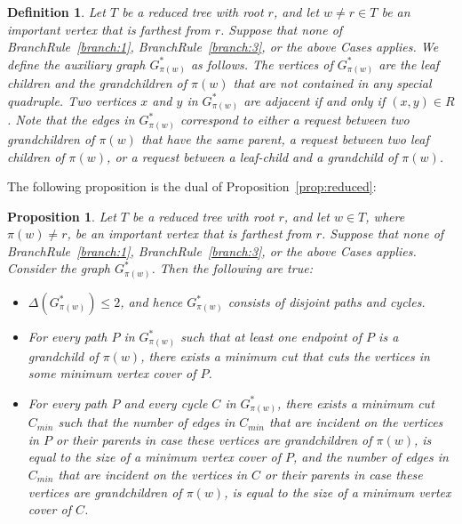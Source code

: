 \documentclass[11pt]{article}
\newtheorem{proposition}[theorem]{Proposition}
\newtheorem{definition}{Definition}[section]
\begin{document}
\begin{definition}\rm
\label{def:auxiliary1}
Let $T$ be a reduced tree with root $r$, and let $w \neq r \in T$ be an important vertex that is farthest from $r$. Suppose that none of BranchRule~\ref{branch:1}, BranchRule~\ref{branch:3}, or the above Cases applies. We define the auxiliary graph $G^*_{\pi(w)}$ as follows. The vertices of $G^*_{\pi(w)}$
are the leaf children and the grandchildren of $\pi(w)$ that are not contained in any special quadruple.  Two vertices $x$ and $y$ in $G^*_{\pi(w)}$ are adjacent if and only if $(x, y) \in R$. Note that the edges in $G^*_{\pi(w)}$ correspond to either a request between two grandchildren of $\pi(w)$ that have the same parent, a request between two leaf children of $\pi(w)$, or a request between a leaf-child and a grandchild of $\pi(w)$.
\end{definition}


The following proposition is the dual of Proposition~\ref{prop:reduced}:

\begin{proposition}
\label{prop:propertiesbranching}
Let $T$ be a reduced tree with root $r$, and let $w \in T$, where $\pi(w) \neq r$, be an important vertex that is farthest from $r$. Suppose that none of BranchRule~\ref{branch:1}, BranchRule~\ref{branch:3}, or the above Cases applies. Consider the graph $G^*_{\pi(w)}$. Then the following are true:

\begin{itemize}
\item [(a)] $\Delta(G^*_{\pi(w)}) \leq 2$, and hence $G^*_{\pi(w)}$ consists of disjoint paths and cycles.

\item[(b)] For every path $P$ in $G^*_{\pi(w)}$ such that at least one endpoint of $P$ is a grandchild of $\pi(w)$, there exists a minimum cut that cuts the vertices in some minimum vertex cover of $P$.


\item[(c)] For every path $P$ and every cycle $C$ in $G^*_{\pi(w)}$, there exists a minimum cut $C_{min}$ such that the number of edges in $C_{min}$ that are incident on the vertices in $P$ or their parents in case these vertices are grandchildren of $\pi(w)$, is equal to the size of a minimum vertex cover of $P$, and the number of edges in $C_{min}$ that are incident on the vertices in $C$ or their parents in case these vertices are grandchildren of $\pi(w)$, is equal to the size of a minimum vertex cover of $C$.

\end{itemize}
\end{proposition}
\end{document}
